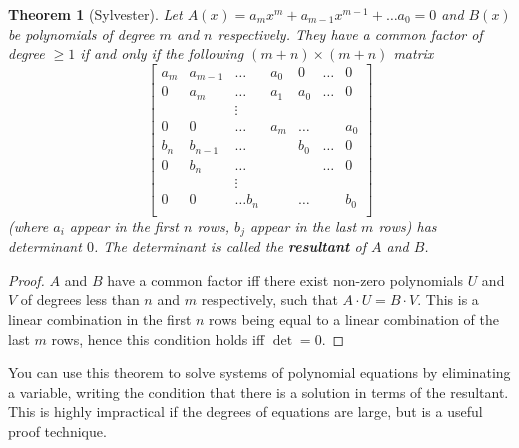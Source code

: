 \documentclass[12pt]{article}
\newtheorem{theorem}{Theorem}
\begin{document}
    \begin{theorem}[Sylvester]
        Let $A(x) = a_mx^m + a_{m-1}x^{m-1} + \dots a_0 = 0$ and $B(x)$ be polynomials of degree $m$ and $n$ respectively. They have a common factor of degree $\geq 1$ if and only if the following $(m+n) \times (m+n)$ matrix
        $$\begin{bmatrix}
            a_m & a_{m-1} & \dots & a_0 & 0 & \dots & 0 \\
            0 & a_m & \dots & a_1 & a_0 & \dots & 0 \\
            & & \vdots & & \\
            0 & 0 & \dots & a_m & \dots & & a_0 \\
            b_n & b_{n-1} & \dots & &  b_0 & \dots & 0 \\
            0 & b_n & \dots & & & \dots & 0 \\
            & & \vdots & & \\
            0 & 0 & \dots b_n & & \dots & & b_0 \\
        \end{bmatrix}$$
        (where $a_i$ appear in the first $n$ rows, $b_j$ appear in the last $m$ rows) has determinant $0$. The determinant is called the \textbf{resultant} of $A$ and $B$. 
    \end{theorem}
    \begin{proof}
        $A$ and $B$ have a common factor iff there exist non-zero polynomials $U$ and $V$ of degrees less than $n$ and $m$ respectively, such that $A\cdot U = B \cdot V$. This is a linear combination in the first $n$ rows being equal to a linear combination of the last $m$ rows, hence this condition holds iff $\det = 0$.  
    \end{proof}
    You can use this theorem to solve systems of polynomial equations by eliminating a variable, writing the condition that there is a solution in terms of the resultant. This is highly impractical if the degrees of equations are large, but is a useful proof technique. 
\end{document}
